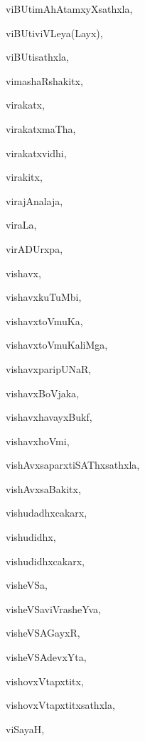 \begin{multicols}{2}
{viBUtimAhAtamxyXsathxla}, \pageref{viBUtimAhAtamxyXsathxla}

{viBUtiviVLeya(Layx)}, \pageref{viBUtiviVLeyaLayx}

{viBUtisathxla}, \pageref{viBUtisathxla}

{vimashaRshakitx}, \pageref{vimashaRshakitx}

{virakatx}, \pageref{virakatx}

{virakatxmaTha}, \pageref{virakatxmaTha}

{virakatxvidhi}, \pageref{virakatxvidhi}

{virakitx}, \pageref{virakitx}

{virajAnalaja}, \pageref{virajAnalaja}

{viraLa}, \pageref{viraLa}

{virADUrxpa}, \pageref{virADUrxpa}

{vishavx}, \pageref{vishavx}

{vishavxkuTuMbi}, \pageref{vishavxkuTuMbi}

{vishavxtoVmuKa}, \pageref{vishavxtoVmuKa}

{vishavxtoVmuKaliMga}, \pageref{vishavxtoVmuKaliMga}

{vishavxparipUNaR}, \pageref{vishavxparipUNaR}

{vishavxBoVjaka}, \pageref{vishavxBoVjaka}

{vishavxhavayxBukf}, \pageref{vishavxhavayxBukf}

{vishavxhoVmi}, \pageref{vishavxhoVmi}

{vishAvxsaparxtiSAThxsathxla}, \pageref{vishAvxsaparxtiSAThxsathxla}

{vishAvxsaBakitx}, \pageref{vishAvxsaBakitx}

{vishudadhxcakarx}, \pageref{vishudadhxcakarx}

{vishudidhx}, \pageref{vishudidhx}

{vishudidhxcakarx}, \pageref{vishudidhxcakarx}

{visheVSa}, \pageref{visheVSa}

{visheVSaviVrasheYva}, \pageref{visheVSaviVrasheYva}

{visheVSAGayxR}, \pageref{visheVSAGayxR}

{visheVSAdevxYta}, \pageref{visheVSAdevxYta}

{vishovxVtapxtitx}, \pageref{vishovxVtapxtitx}

{vishovxVtapxtitxsathxla}, \pageref{vishovxVtapxtitxsathxla}

{viSayaH}, \pageref{viSayaH}


\end{multicols}
